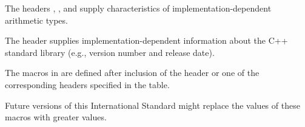 \pnum
The headers
,
, and
supply characteristics of
%
imple\-mentation-dependent
arithmetic types.

\pnum
The header 
supplies implementation-dependent information
about the C++ standard library
(e.g., version number and release date).

\pnum
The macros in  are defined
after inclusion of the header  or
one of the corresponding headers specified in the table.
\begin{note}
Future versions of this International Standard might replace
the values of these macros with greater values.
\end{note}

